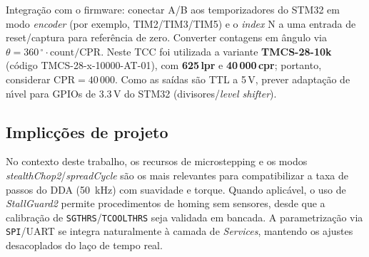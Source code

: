 Integra\c{c}\~ao com o firmware: conectar A/B aos temporizadores do STM32 em modo
\emph{encoder} (por exemplo, TIM2/TIM3/TIM5) e o \emph{index} N a uma entrada
de reset/captura para refer\^encia de zero. Converter contagens em \^angulo via
\(\theta = 360\,^{\circ} \cdot \text{count}/\text{CPR}\). Neste TCC foi utilizada a
variante \textbf{TMCS-28-10k} (c\'odigo TMCS-28-x-10000-AT-01), com
\textbf{625\,lpr} e \textbf{40\,000\,cpr}; portanto, considerar \(\text{CPR}=40\,000\).
Como as sa\'idas s\~ao TTL a 5\,V, prever adapta\c{c}\~ao
de n\'{\i}vel para GPIOs de 3.3\,V do STM32 (divisores/\emph{level shifter}).

\subsection{Implic\c{c}\~oes de projeto}

No contexto deste trabalho, os recursos de microstepping e os modos
\textit{stealthChop2}/\textit{spreadCycle} s\~ao os mais relevantes para
compatibilizar a taxa de passos do DDA (\SI{50}{\kilo\hertz}) com suavidade e
torque. Quando aplic\'avel, o uso de \textit{StallGuard2} permite
procedimentos de homing sem sensores, desde que a calibra\c{c}\~ao de
\texttt{SGTHRS}/\texttt{TCOOLTHRS} seja validada em bancada. A parametriza\c{c}\~ao
via \texttt{SPI}/UART se integra naturalmente \`a camada de \emph{Services},
mantendo os ajustes desacoplados do la\c{c}o de tempo real.
